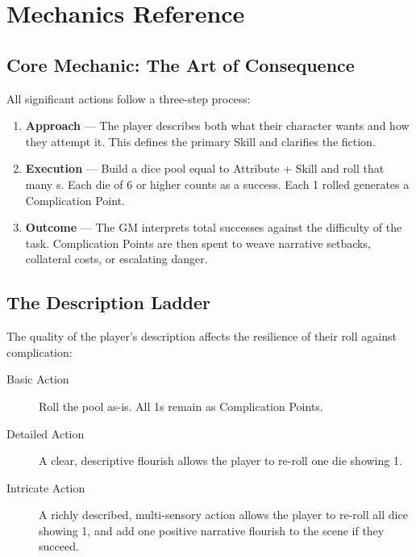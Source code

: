 \chapter{Mechanics Reference}

\section{Core Mechanic: The Art of Consequence}

All significant actions follow a three-step process:

\begin{enumerate}
\item \textbf{Approach} --- The player describes both what their character wants and how they attempt it. This defines the primary Skill and clarifies the fiction.
\item \textbf{Execution} --- Build a dice pool equal to Attribute + Skill and roll that many s. Each die of 6 or higher counts as a success. Each 1 rolled generates a Complication Point.
\item \textbf{Outcome} --- The GM interprets total successes against the difficulty of the task. Complication Points are then spent to weave narrative setbacks, collateral costs, or escalating danger.
\end{enumerate}

\section{The Description Ladder}

The quality of the player's description affects the resilience of their roll against complication:

\begin{description}
\item[Basic Action] Roll the pool as-is. All 1s remain as Complication Points.
\item[Detailed Action] A clear, descriptive flourish allows the player to re-roll one die showing 1.
\item[Intricate Action] A richly described, multi-sensory action allows the player to re-roll all dice showing 1, and add one positive narrative flourish to the scene if they succeed.
\end{description}

